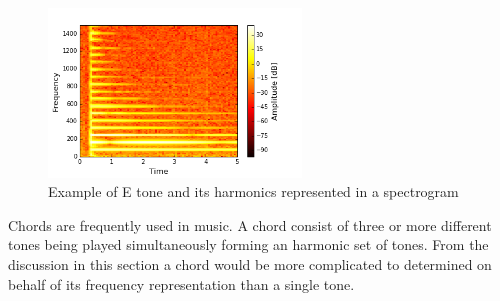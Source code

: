 \begin{figure}[H]
    \centering
    \includegraphics[width = 0.6\textwidth]{figures/Music/eks_ch2.png}
    \caption{Example of E tone and its harmonics represented in a spectrogram}
    \label{fig:E_spec}
\end{figure}
Chords are frequently used in music. A chord consist of three or more different tones being played simultaneously forming an harmonic set of tones. From the discussion in this section a chord would be more complicated to determined on behalf of its frequency representation than a single tone.
